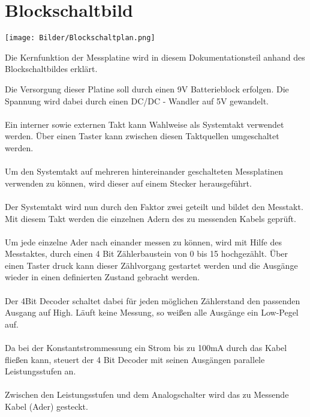 \documentclass[a4paper,11pt]{scrartcl}
\begin{document}
\section{Blockschaltbild}
	
\begin{center}
\texttt{[image: Bilder/Blockschaltplan.png]}
\end{center}

\newpage

\begin{center}
Die Kernfunktion der Messplatine wird in diesem Dokumentationsteil anhand des Blockschaltbildes erklärt. 
\end{center}

Die Versorgung dieser Platine soll durch einen 9V Batterieblock erfolgen. Die Spannung wird dabei durch einen DC/DC - Wandler auf 5V gewandelt.
\\
\\
Ein interner sowie externen Takt kann Wahlweise als Systemtakt verwendet werden. Über einen Taster kann zwischen diesen Taktquellen umgeschaltet werden.
\\
\\
Um den Systemtakt auf mehreren hintereinander geschalteten Messplatinen verwenden zu können, wird dieser auf einem Stecker herausgeführt.
\\
\\
Der Systemtakt wird nun durch den Faktor zwei geteilt und bildet den Messtakt. Mit diesem Takt werden die einzelnen Adern des zu messenden Kabels geprüft.
\\
\\
Um jede einzelne Ader nach einander messen zu können, wird mit Hilfe des Messtaktes, durch einen 4 Bit Zählerbaustein von 0 bis 15 hochgezählt. Über einen Taster druck kann dieser Zählvorgang gestartet werden und die Ausgänge wieder in einen definierten Zustand gebracht werden.
\\
\\
Der 4Bit Decoder schaltet dabei für jeden möglichen Zählerstand den passenden Ausgang auf High. Läuft keine Messung, so weißen alle Ausgänge ein Low-Pegel auf. 
\\
\\
Da bei der Konstantstrommessung ein Strom bis zu 100mA durch das Kabel fließen kann, steuert der 4 Bit Decoder mit seinen Ausgängen parallele Leistungsstufen an.
\\
\\
Zwischen den Leistungsstufen und dem Analogschalter wird das zu Messende Kabel  (Ader) gesteckt. 
\end{document}
